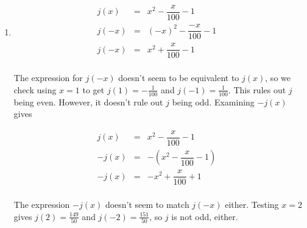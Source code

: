 {\begin{enumerate}
\setlength{\extrarowheight}{8pt}

 \[ \begin{array}{rclr}   

i(x) & = & \dfrac{5x}{2x - x^3} & \\ 
& = & \dfrac{(-1) 5x}{(-1)\left(2x - x^3\right)} & \\ 
& = & \dfrac{-5x}{-2x + x^3} & \\  

\end{array} \]

\setlength{\extrarowheight}{2pt}

Hence, $i(x) = i(-x)$, so $i$ is even. See Figure \ref{fig:evenodd4} for the graph.


\setlength{\extrarowheight}{8pt}

\item  \[ \begin{array}{rclr}   

j(x) & = & x^2 - \dfrac{x}{100} - 1 & \\ 
j(-x) & = & (-x)^2 - \dfrac{-x}{100} - 1 & \\   
j(-x) & = & x^2 + \dfrac{x}{100} - 1 & \\   

\end{array} \]

\setlength{\extrarowheight}{2pt}

The expression for $j(-x)$ doesn't seem to be equivalent to $j(x)$, so we check using $x = 1$ to get $j(1) = -\frac{1}{100}$ and $j(-1) = \frac{1}{100}$.  This rules out $j$ being even.  However, it doesn't rule out $j$ being odd.  Examining $-j(x)$ gives

\setlength{\extrarowheight}{8pt}

 \[ \begin{array}{rclr}   

j(x) & = & x^2 - \dfrac{x}{100} - 1 & \\ 
-j(x) & = & -\left(x^2 - \dfrac{x}{100} - 1\right) & \\   
-j(x) & = & -x^2 + \dfrac{x}{100} + 1 & \\   

\end{array} \]

\setlength{\extrarowheight}{2pt}

The expression $-j(x)$ doesn't seem to match $j(-x)$ either.  Testing $x = 2$ gives $j(2) = \frac{149}{50}$ and $j(-2) = \frac{151}{50}$, so $j$ is not odd, either. 


\end{enumerate}}
